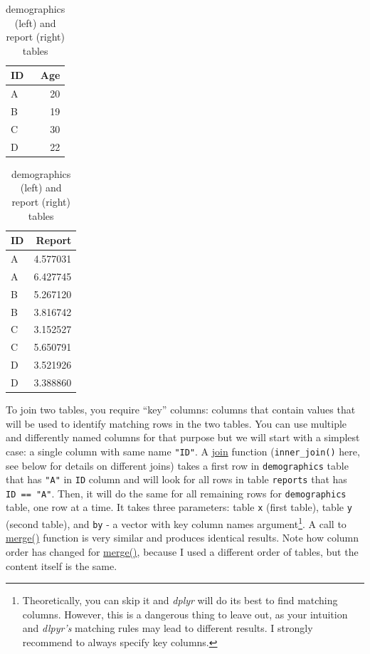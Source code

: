 \documentclass[
]{book}
\begin{document}
\begin{table}
\caption{\label{tab:unnamed-chunk-176}demographics (left) and report (right) tables}

\centering
\begin{tabular}[t]{l|r}
\hline
ID & Age\\
\hline
A & 20\\
\hline
B & 19\\
\hline
C & 30\\
\hline
D & 22\\
\hline
\end{tabular}
\centering
\begin{tabular}[t]{l|r}
\hline
ID & Report\\
\hline
A & 4.577031\\
\hline
A & 6.427745\\
\hline
B & 5.267120\\
\hline
B & 3.816742\\
\hline
C & 3.152527\\
\hline
C & 5.650791\\
\hline
D & 3.521926\\
\hline
D & 3.388860\\
\hline
\end{tabular}
\end{table}

To join two tables, you require ``key'' columns: columns that contain values that will be used to identify matching rows in the two tables. You can use multiple and differently named columns for that purpose but we will start with a simplest case: a single column with same name \texttt{"ID"}. A \href{https://dplyr.tidyverse.org/reference/mutate-joins.html}{join} function (\texttt{inner\_join()} here, see below for details on different joins) takes a first row in \texttt{demographics} table that has \texttt{"A"} in \texttt{ID} column and will look for all rows in table \texttt{reports} that has \texttt{ID\ ==\ "A"}. Then, it will do the same for all remaining rows for \texttt{demographics} table, one row at a time. It takes three parameters: table \texttt{x} (first table), table \texttt{y} (second table), and \texttt{by} - a vector with key column names argument\footnote{Theoretically, you can skip it and \emph{dplyr} will do its best to find matching columns. However, this is a dangerous thing to leave out, as your intuition and \emph{dlpyr's} matching rules may lead to different results. I strongly recommend to always specify key columns.}. A call to \href{https://stat.ethz.ch/R-manual/R-devel/library/base/html/merge.html}{merge()} function is very similar and produces identical results. Note how column order has changed for \href{https://stat.ethz.ch/R-manual/R-devel/library/base/html/merge.html}{merge()}, because I used a different order of tables, but the content itself is the same.
\end{document}
